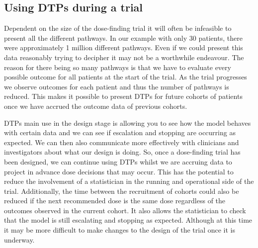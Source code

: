 \subsection{Using DTPs during a trial}

Dependent on the size of the dose-finding trial it will often be infeasible to present all the different pathways. In our example with only 30 patients, there were approximately 1 million different pathways. Even if we could present this data reasonably trying to decipher it may not be a worthwhile endeavour. The reason for there being so many pathways is that we have to evaluate every possible outcome for all patients at the start of the trial. As the trial progresses we observe outcomes for each patient and thus the number of pathways is reduced. This makes it possible to present DTPs for future cohorts of patients once we have accrued the outcome data of previous cohorts. 

DTPs main use in the design stage is allowing you to see how the model behaves with certain data and we can see if escalation and stopping are occurring as expected. We can then also communicate more effectively with clinicians and investigators about what our design is doing. So, once a dose-finding trial has been designed, we can continue using DTPs whilst we are accruing data to project in advance dose decisions that may occur. This has the potential to reduce the involvement of a statistician in the running and operational side of the trial. Additionally, the time between the recruitment of cohorts could also be reduced if the next recommended dose is the same dose regardless of the outcomes observed in the current cohort. It also allows the statistician to check that the model is still escalating and stopping as expected. Although at this time it may be more difficult to make changes to the design of the trial once it is underway. 

